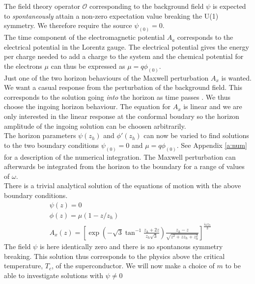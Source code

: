 \documentclass[12pt]{report}
\renewcommand{\i}{\ensuremath{i}}
\newcommand{\At}{\ensuremath{{\phi}}}
\begin{document}
The field theory operator $\mathcal{O}$ corresponding to the background field $\psi$ is expected to \emph{spontaneously} attain a non-zero expectation value breaking the U(1) symmetry. We therefore require the source $\psi_{(0)}=0$.\\

The time component of the electromagnetic potential $A_a$ corresponds to the electrical potential in the Lorentz gauge. The electrical potential gives the energy per charge needed to add a charge to the system and the chemical potential for the electrons $\mu$ can thus be expressed as $\mu=q\phi_{(0)}$.\\

Just one of the two horizon behaviours of the Maxwell perturbation $A_x$ is wanted. We want a casual response from the perturbation of the background field. This corresponds to the solution going \emph{into} the horizon as time passes \cite{hartnoll8}. We thus choose the ingoing horizon behaviour. The equation for $A_x$ is linear and we are only interested in the linear response at the conformal boudary so the horizon amplitude of the ingoing solution can be choosen arbitrarily.\\

The horizon parameters $\psi(z_h)$ and $\At'(z_h)$ can now be varied to find solutions to the two boundary conditions $\psi_{(0)}=0$ and $\mu=q\phi_{(0)}$. See Appendix \ref{a:num} for a description of the numerical integration. The Maxwell perturbation can afterwards be integrated from the horizon to the boundary for a range of values of $\omega$.\\

There is a trivial analytical solution of the equations of motion with the above boundary conditions.
\begin{equation}
\begin{split}
 &\psi(z)=0\\
 &\phi(z)=\mu(1-z/z_h)\\
 &A_x(z)=
\left[
\exp\left( - \sqrt{3}\tan^{-1} \frac{z_h+2z}{z_h\sqrt{3}} \right)
\frac{z_h-z}{\sqrt{z^2+zz_h+z_h^2}}
\right]^{\frac{\i\omega z_h}{3} }   \label{trivial}
\end{split}
\end{equation}
The field $\psi$ is here identically zero and there is no spontanous symmetry breaking. This solution thus corresponds to the physics above the critical temperature, $T_c$, of the superconductor. We will now make a choice of $m$ to be able to investigate solutions with $\psi\neq0$
\end{document}
